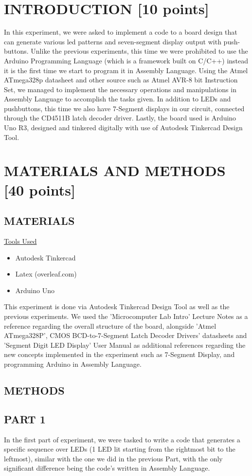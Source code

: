 \documentclass[pdftex,12pt,a4paper]{article}
\begin{document}
\section{INTRODUCTION [10 points]}
In this experiment, we were asked to implement a code to a board design that can generate various led patterns and seven-segment display output with push-buttons. Unlike the previous experiments, this time we were prohibited to use the Arduino Programming Language (which is a framework built on C/C++) instead it is the first time we start to program it in Assembly Language. Using the Atmel ATmega328p datasheet and other source such as Atmel AVR-8 bit Instruction Set, we managed to implement the necessary operations and manipulations in Assembly Language to accomplish the tasks given. In addition to LEDs and pushbuttons, this time we also have 7-Segment displays in our circuit, connected through the CD4511B latch decoder driver. Lastly, the board used is Arduino Uno R3, designed and tinkered digitally with use of Autodesk Tinkercad Design Tool.


\section{MATERIALS AND METHODS [40 points]}
\subsection{MATERIALS}
\underline{Tools Used}\cite{booklet}
\begin{itemize}
    \item {Autodesk Tinkercad}
    \item{Latex (overleaf.com)}
    \item{Arduino Uno}
\end{itemize}

This experiment is done via Autodesk Tinkercad Design Tool as well as the previous experiments. We used the 'Microcomputer Lab Intro' Lecture Notes as a reference regarding the overall structure of the board, alongside 'Atmel ATmega328P', CMOS BCD-to-7-Segment Latch Decoder Drivers' datasheets and 'Segment Digit LED Display' User Manual as additional references regarding the new concepts implemented in the experiment such as 7-Segment Display, and programming Arduino in Assembly Language.
\newpage
\subsection{METHODS}
\subsection{PART 1}
In the first part of experiment, we were tasked to write a code that generates a specific sequence over LEDs (1 LED lit starting from the rightmost bit to the leftmost), similar with the one we did in the previous Part, with the only significant difference being the code's written in Assembly Language. 
\end{document}

